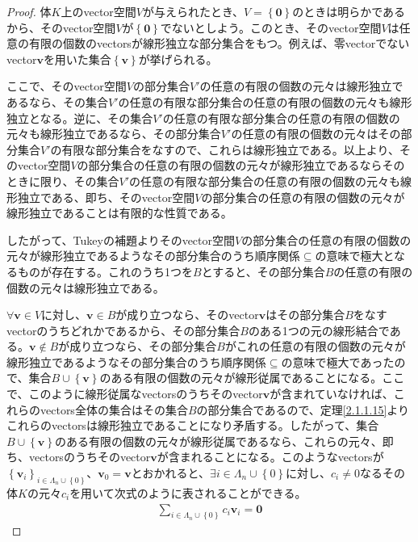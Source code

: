 \documentclass[dvipdfmx]{jsarticle}
\begin{document}
\begin{proof}
体$K$上のvector空間$V$が与えられたとき、$V = \left\{ \mathbf{0} \right\}$のときは明らかであるから、そのvector空間$V$が$\left\{ \mathbf{0} \right\}$でないとしよう。このとき、そのvector空間$V$は任意の有限の個数のvectorsが線形独立な部分集合をもつ。例えば、零vectorでないvector$\mathbf{v}$を用いた集合$\left\{ \mathbf{v} \right\}$が挙げられる。\par
ここで、そのvector空間$V$の部分集合$V'$の任意の有限の個数の元々は線形独立であるなら、その集合$V'$の任意の有限な部分集合の任意の有限の個数の元々も線形独立となる。逆に、その集合$V'$の任意の有限な部分集合の任意の有限の個数の元々も線形独立であるなら、その部分集合$V'$の任意の有限の個数の元々はその部分集合$V'$の有限な部分集合をなすので、これらは線形独立である。以上より、そのvector空間$V$の部分集合の任意の有限の個数の元々が線形独立であるならそのときに限り、その集合$V'$の任意の有限な部分集合の任意の有限の個数の元々も線形独立である、即ち、そのvector空間$V$の部分集合の任意の有限の個数の元々が線形独立であることは有限的な性質である。\par
したがって、Tukeyの補題よりそのvector空間$V$の部分集合の任意の有限の個数の元々が線形独立であるようなその部分集合のうち順序関係$\subseteq$の意味で極大となるものが存在する。これのうち1つを$B$とすると、その部分集合$B$の任意の有限の個数の元々は線形独立である。\par
$\forall\mathbf{v} \in V$に対し、$\mathbf{v} \in B$が成り立つなら、そのvector$\mathbf{v}$はその部分集合$B$をなすvectorのうちどれかであるから、その部分集合$B$のある1つの元の線形結合である。$\mathbf{v} \notin B$が成り立つなら、その部分集合$B$がこれの任意の有限の個数の元々が線形独立であるようなその部分集合のうち順序関係$\subseteq$の意味で極大であったので、集合$B \cup \left\{ \mathbf{v} \right\}$のある有限の個数の元々が線形従属であることになる。ここで、このように線形従属なvectorsのうちそのvector$\mathbf{v}$が含まれていなければ、これらのvectors全体の集合はその集合$B$の部分集合であるので、定理\ref{2.1.1.15}よりこれらのvectorsは線形独立であることになり矛盾する。したがって、集合$B \cup \left\{ \mathbf{v} \right\}$のある有限の個数の元々が線形従属であるなら、これらの元々、即ち、vectorsのうちそのvector$\mathbf{v}$が含まれることになる。このようなvectorsが$\left\{ \mathbf{v}_{i} \right\}_{i \in \varLambda_{n} \cup \left\{ 0 \right\}}$、$\mathbf{v}_{0} = \mathbf{v}$とおかれると、$\exists i \in \varLambda_{n} \cup \left\{ 0 \right\}$に対し、$c_{i} \neq 0$なるその体$K$の元々$c_{i}$を用いて次式のように表されることができる。
\begin{align*}
\sum_{i \in \varLambda_{n} \cup \left\{ 0 \right\}} {c_{i}\mathbf{v}_{i}} = \mathbf{0}

\end{align*}
\end{proof}
\end{document}
